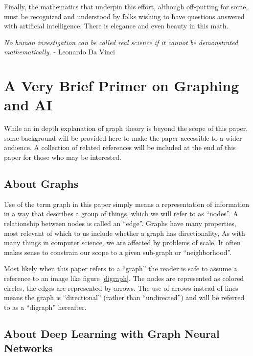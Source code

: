 \justifying
Finally, the mathematics that underpin this effort, although off-putting for some, must be recognized and understood by
folks wishing to have questions answered with artificial intelligence. There is elegance and even beauty in this math.
\vspace{2mm}

\begin{displayquote}
	\emph{No human investigation can be called real science if it cannot be demonstrated mathematically.}
	- Leonardo Da Vinci
\end{displayquote}

\clearpage

\section{\label{sec:primer}A Very Brief Primer on Graphing and AI}

\justifying
While an in depth explanation of graph theory is beyond the scope of this paper, some background
will be provided here to make the paper accessible to a wider audience. A collection of related references
will be included at the end of this paper for those who may be interested.

\subsection{\label{sec:Graph}About Graphs}

\justifying
Use of the term graph in this paper simply means a representation of information in a way that describes a group of 
things, which we will refer to as ``nodes''. A relationship between nodes is called an ``edge''. Graphs have many 
properties, most relevant of which to us include whether a graph has directionality, As with many things in computer
science, we are affected by problems of scale. It often makes sense to constrain our scope to a given sub-graph or ``neighborhood''.
\vspace{2mm}

\justifying
Most likely when this paper refers to a ``graph'' the reader is safe to assume a reference to an image like figure \ref{digraph}. The nodes are represented as colored circles, the edges are represented by arrows. The use of arrows
instead of lines means the graph is ``directional'' (rather than ``undirected'') and will be referred to as a ``digraph''
hereafter.
\vspace{2mm}

\subsection{\label{sec:DL}About Deep Learning with Graph Neural Networks}

